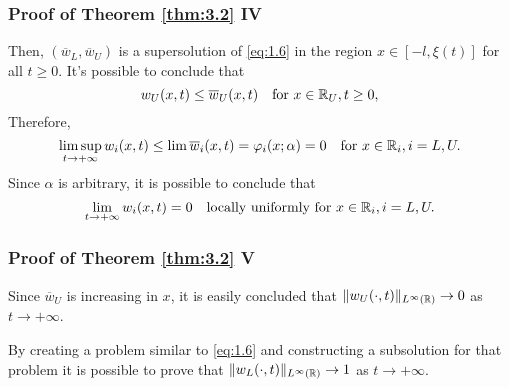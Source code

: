 \begin{frame}
    \frametitle{Proof of Theorem \ref{thm:3.2} IV}
    \begin{proofc}
        Then, \((\overline{w}_L, \overline{w}_U)\) is a supersolution of \eqref{eq:1.6} in the region \(x \in [-l, \xi(t)]\) for all \(t \geq 0\). It's possible to conclude that
        \[
            w_U(x, t) \leq \overline{w}_U(x, t) \quad \text{for } x \in \mathbb{R}_U, t \geq 0,
        \]
        Therefore,
        \[
            \limsup_{t \to +\infty} w_i(x, t) \leq \lim \overline{w}_i(x, t) = \varphi_i(x; \alpha) = 0 \quad \text{for } x \in \mathbb{R}_i, i = L, U.
        \]
        Since \(\alpha\) is arbitrary, it is possible to conclude that
        \[
            \lim_{t \to +\infty} w_i(x, t) = 0 \quad \text{locally uniformly for } x \in \mathbb{R}_i, i = L, U.
        \]
    \end{proofc}
\end{frame}


\begin{frame}
    \frametitle{Proof of Theorem \ref{thm:3.2} V}
    \begin{proofe}
        Since \(\overline{w}_U\) is increasing in \(x\), it is easily concluded that \(\lVert w_U(\cdot, t)\rVert_{L^{\infty}(\mathbb{R})} \to 0\) as \(t \to +\infty\).

        By creating a problem similar to \eqref{eq:1.6} and constructing a subsolution for that problem it is possible to prove that \(\lVert w_L(\cdot, t)\rVert_{L^{\infty}(\mathbb{R})} \to 1\) as \(t \to +\infty\).
    \end{proofe}
\end{frame}